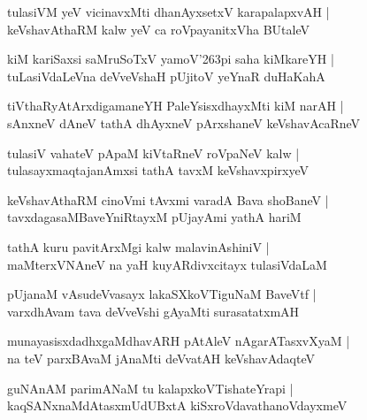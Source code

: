 \documentclass[twoside,12pt,openright]{book}
\def\S{\char'263}
\newcounter{shloka}[chapter]
\begin{document}
\begin{shloka}%
tulasiVM yeV vicinavxMti dhanAyxsetxV karapalapxvAH |\\
keVshavAthaRM kalw yeV ca roVpayanitxVha BUtaleV 
\end{shloka}

\begin{shloka}%
kiM kariSaxsi saMruSoTxV yamoV\S pi saha kiMkareYH |\\
tuLasiVdaLeVna deVveVshaH pUjitoV yeYnaR duHaKahA 
\end{shloka}

\begin{shloka}%
tiVthaRyAtArxdigamaneYH PaleYsisxdhayxMti kiM narAH |\\
sAnxneV dAneV tathA dhAyxneV pArxshaneV keVshavAcaRneV 
\end{shloka}

\begin{shloka}%
tulasiV vahateV pApaM kiVtaRneV roVpaNeV kalw |\\
tulasayxmaqtajanAmxsi tathA tavxM keVshavxpirxyeV 
\end{shloka}

\begin{shloka}%
keVshavAthaRM cinoVmi tAvxmi varadA Bava shoBaneV |\\
tavxdagasaMBaveYniRtayxM pUjayAmi yathA hariM 
\end{shloka}

\begin{shloka}%
tathA kuru pavitArxMgi kalw malavinAshiniV |\\
maMterxVNAneV na yaH kuyARdivxcitayx tulasiVdaLaM 
\end{shloka}

\begin{shloka}%
pUjanaM vAsudeVvasayx lakaSXkoVTiguNaM BaveVtf |\\
varxdhAvam tava deVveVshi gAyaMti surasatatxmAH 
\end{shloka}

\begin{shloka}%
munayasisxdadhxgaMdhavARH pAtAleV nAgarATasxvXyaM |\\
na teV parxBAvaM jAnaMti deVvatAH keVshavAdaqteV 
\end{shloka}

\begin{shloka}%
guNAnAM parimANaM tu kalapxkoVTishateYrapi |\\
kaqSANxnaMdAtasxmUdUBxtA kiSxroVdavathanoVdayxmeV 
\end{shloka}
\end{document}
